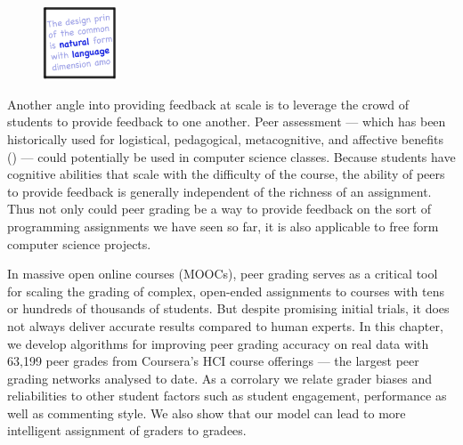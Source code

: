 \begin{figure}[h!]
\includegraphics[width=0.2\textwidth]{img/assnType_5}
\end{figure}

Another angle into providing feedback at scale is to leverage the crowd of students to provide feedback to one another. Peer assessment --- which has been historically used 
for logistical, pedagogical, metacognitive, and affective benefits (\cite{sadler06})
 --- 
could potentially be used in computer science classes. Because students have cognitive abilities that scale with the difficulty of the course, the ability of peers to provide feedback is generally independent of the richness of an assignment. Thus not only could peer grading be a way to provide feedback on the sort of programming assignments we have seen so far, it is also applicable to free form computer science projects.

In massive open online courses (MOOCs), peer grading serves as a critical tool for scaling the grading of complex, open-ended assignments to courses with tens or hundreds of thousands of students. But despite promising initial trials, it does not always deliver accurate results compared to human experts. In this chapter, we develop algorithms for improving peer grading accuracy on real data with 63,199 peer grades from Coursera's HCI course offerings --- the largest peer grading networks analysed to date. As a corrolary we relate grader biases and reliabilities to other student factors such as student engagement, performance as well as commenting style. We also show that our model can lead to more intelligent assignment of graders to gradees.

